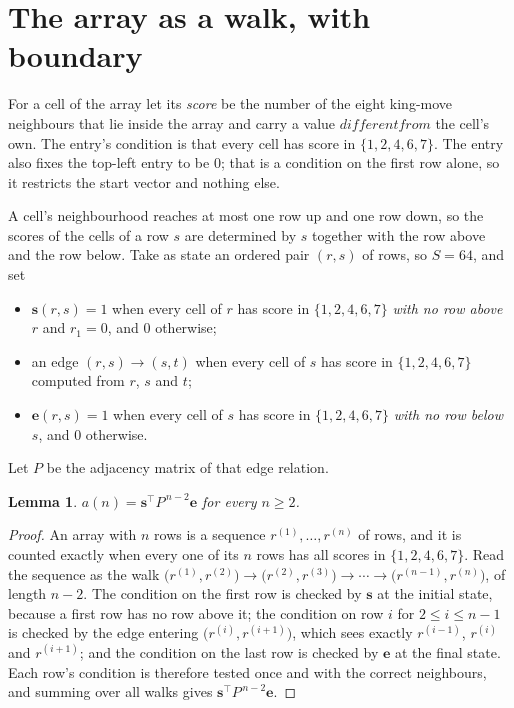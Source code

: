 \documentclass[11pt,a4paper]{article}
\theoremstyle{plain}
\newtheorem{lemma}[theorem]{Lemma}
\theoremstyle{definition}
\begin{document}
\section{The array as a walk, with boundary}

For a cell of the array let its \emph{score} be the number of the eight king-move neighbours that lie inside
the array and carry a value $different from$ the cell's own. The entry's condition is that every cell
has score in $\{1,2,4,6,7\}$. The entry also fixes the top-left entry to be $0$; that is a condition on the first row alone, so it restricts the start vector and nothing else.

A cell's neighbourhood reaches at most one row up and one row down, so the scores of the
cells of a row $s$ are determined by $s$ together with the row above and the row below.
Take as state an ordered pair $(r,s)$ of rows, so $S=64$, and set
\begin{itemize}
\item $\mathbf{s}(r,s)=1$ when every cell of $r$ has score in $\{1,2,4,6,7\}$ \emph{with no row
above $r$} and $r_1=0$, and $0$ otherwise;
\item an edge $(r,s)\to(s,t)$ when every cell of $s$ has score in $\{1,2,4,6,7\}$ computed from
$r$, $s$ and $t$;
\item $\mathbf{e}(r,s)=1$ when every cell of $s$ has score in $\{1,2,4,6,7\}$ \emph{with no row
below $s$}, and $0$ otherwise.
\end{itemize}
Let $P$ be the adjacency matrix of that edge relation.

\begin{lemma}\label{lem:walk}
$a(n)=\mathbf{s}^{\!\top}P^{\,n-2}\mathbf{e}$ for every $n\ge2$.
\end{lemma}

\begin{proof}
An array with $n$ rows is a sequence $r^{(1)},\dots,r^{(n)}$ of rows, and it is counted
exactly when every one of its $n$ rows has all scores in $\{1,2,4,6,7\}$. Read the sequence as the
walk $\bigl(r^{(1)},r^{(2)}\bigr)\to\bigl(r^{(2)},r^{(3)}\bigr)\to\cdots\to
\bigl(r^{(n-1)},r^{(n)}\bigr)$, of length $n-2$. The condition on the first row is
checked by $\mathbf{s}$ at the initial state, because a first row has no row above it; the
condition on row $i$ for $2\le i\le n-1$ is checked by the edge entering
$\bigl(r^{(i)},r^{(i+1)}\bigr)$, which sees exactly $r^{(i-1)}$, $r^{(i)}$ and
$r^{(i+1)}$; and the condition on the last row is checked by $\mathbf{e}$ at the final
state. Each row's condition is therefore tested once and with the correct neighbours, and
summing over all walks gives $\mathbf{s}^{\!\top}P^{\,n-2}\mathbf{e}$.
\end{proof}
\end{document}
